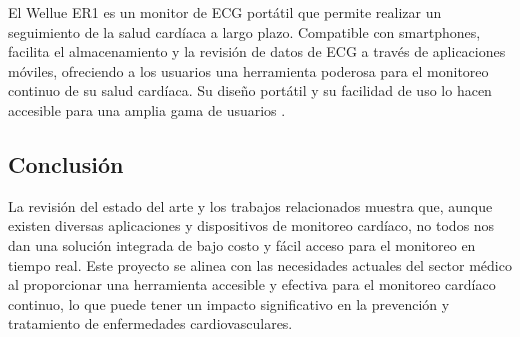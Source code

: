 El Wellue ER1 es un monitor de ECG portátil que permite realizar un seguimiento de la salud cardíaca a largo plazo. Compatible con smartphones, facilita el almacenamiento y la revisión de datos de ECG a través de aplicaciones móviles, ofreciendo a los usuarios una herramienta poderosa para el monitoreo continuo de su salud cardíaca. Su diseño portátil y su facilidad de uso lo hacen accesible para una amplia gama de usuarios \cite{wellue}.

\subsection{Conclusión}

La revisión del estado del arte y los trabajos relacionados muestra que, aunque existen diversas aplicaciones y dispositivos de monitoreo cardíaco, no todos nos dan una solución integrada de bajo costo y fácil acceso para el monitoreo en tiempo real. Este proyecto se alinea con las necesidades actuales del sector médico al proporcionar una herramienta accesible y efectiva para el monitoreo cardíaco continuo, lo que puede tener un impacto significativo en la prevención y tratamiento de enfermedades cardiovasculares.

































